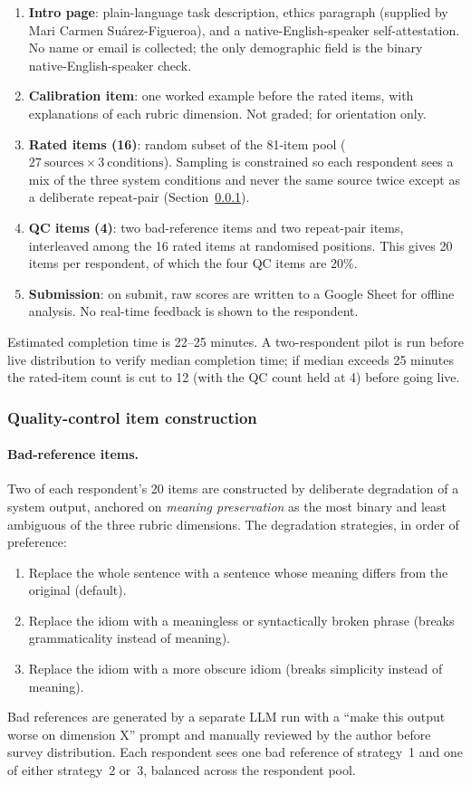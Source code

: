 \begin{enumerate}
    \item \textbf{Intro page}: plain-language task description, ethics paragraph (supplied by Mari Carmen Su\'arez-Figueroa), and a native-English-speaker self-attestation. No name or email is collected; the only demographic field is the binary native-English-speaker check.
    \item \textbf{Calibration item}: one worked example before the rated items, with explanations of each rubric dimension. Not graded; for orientation only.
    \item \textbf{Rated items (16)}: random subset of the 81-item pool ($27~\text{sources} \times 3~\text{conditions}$). Sampling is constrained so each respondent sees a mix of the three system conditions and never the same source twice except as a deliberate repeat-pair (Section~\ref{appendix:qc-construction}).
    \item \textbf{QC items (4)}: two bad-reference items and two repeat-pair items, interleaved among the 16 rated items at randomised positions. This gives 20 items per respondent, of which the four QC items are 20\%.
    \item \textbf{Submission}: on submit, raw scores are written to a Google Sheet for offline analysis. No real-time feedback is shown to the respondent.
\end{enumerate}

Estimated completion time is 22--25 minutes. A two-respondent pilot is run before live distribution to verify median completion time; if median exceeds 25 minutes the rated-item count is cut to 12 (with the QC count held at 4) before going live.

\subsubsection{Quality-control item construction}
\label{appendix:qc-construction}

\paragraph{Bad-reference items.} Two of each respondent's 20 items are constructed by deliberate degradation of a system output, anchored on \textit{meaning preservation} as the most binary and least ambiguous of the three rubric dimensions. The degradation strategies, in order of preference:
\begin{enumerate}
    \item Replace the whole sentence with a sentence whose meaning differs from the original (default).
    \item Replace the idiom with a meaningless or syntactically broken phrase (breaks grammaticality instead of meaning).
    \item Replace the idiom with a more obscure idiom (breaks simplicity instead of meaning).
\end{enumerate}
Bad references are generated by a separate LLM run with a ``make this output worse on dimension X'' prompt and manually reviewed by the author before survey distribution. Each respondent sees one bad reference of strategy~1 and one of either strategy~2 or~3, balanced across the respondent pool.

